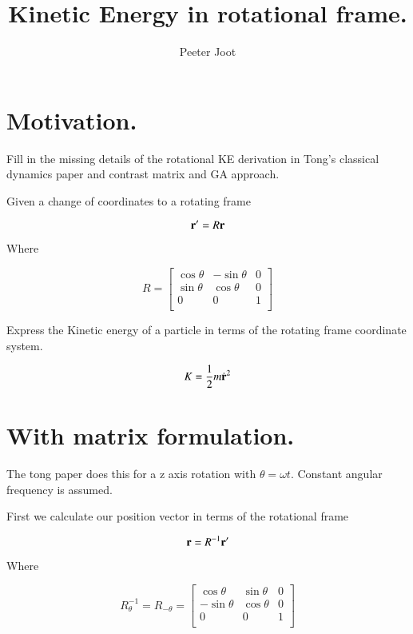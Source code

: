 \documentclass{article}      %
\title{ Kinetic Energy in rotational frame. } %
\author{Peeter Joot}         %
\newcommand{\dt}[1]{\dot{#1}}
\begin{document}

\maketitle{}

\section{ Motivation. }

Fill in the missing details of the rotational KE derivation in Tong's classical
dynamics paper and contrast matrix and GA approach.

Given a change of coordinates to a rotating frame

\begin{equation}\label{eqn:rotcoord}
\mathbf{r}' = R \mathbf{r}
\end{equation}

Where

\[
R = 
\begin{bmatrix}
\cos \theta & -\sin \theta & 0 \\
\sin \theta & \cos \theta & 0 \\
0 & 0 & 1 \\
\end{bmatrix}
\]

Express the Kinetic energy of a particle in terms of the rotating frame
coordinate system.

\[
K = 
\inv{2} m \dt{\Br}^2 %
\]

\section{ With matrix formulation. }

The tong paper does this for a z axis rotation with $\theta = \omega t$.
Constant angular frequency is assumed.

First we calculate our position vector in terms of the rotational frame

\[
\mathbf{r} = R^{-1}\mathbf{r}'
\]

Where

\[
R_\theta^{-1} = R_{-\theta} =
\begin{bmatrix}
\cos \theta & \sin \theta & 0 \\
-\sin \theta & \cos \theta & 0 \\
0 & 0 & 1 \\
\end{bmatrix}
\]
\end{document}
